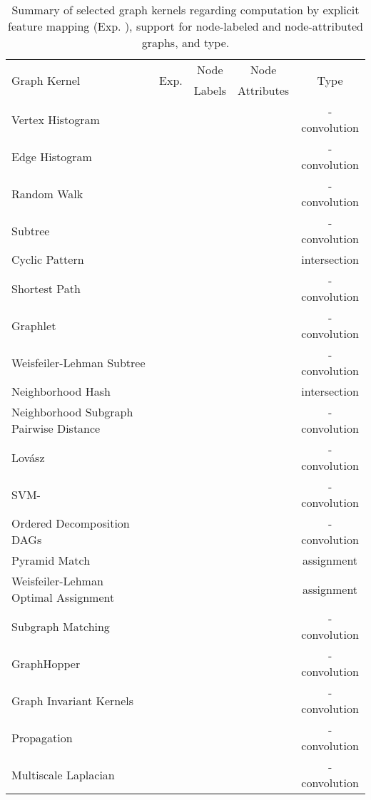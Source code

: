 \documentclass[twoside,11pt]{article}
\begin{document}
\begin{table}[t]
  \centering
  \scriptsize
  \begin{sc}
  \def\arraystretch{1.2}
  \begin{tabular}{l|c|c|c|c}
    \multirow{2}{*}{Graph Kernel}& \multirow{2}{*}{Exp. } & Node & Node & \multirow{2}{*}{Type} \\ 
    & & Labels & Attributes & \\ \hline
    Vertex Histogram &  &  &  & -convolution \\ 
    Edge Histogram &  &  &  & -convolution \\ 
    Random Walk &  &  &  & -convolution \\
    Subtree &  &  &  & -convolution \\
    Cyclic Pattern &  &  &  & intersection \\
    Shortest Path &  &  &  & -convolution  \\
    Graphlet &  &  &  & -convolution \\
    Weisfeiler-Lehman Subtree &  &  &  & -convolution \\ 
    Neighborhood Hash &  &  &  & intersection \\
    Neighborhood Subgraph Pairwise Distance &  &  &  & -convolution \\
    Lov\'asz  &  &  &  & -convolution \\ 
    SVM- &  &  &  & -convolution \\ 
    Ordered Decomposition DAGs &  &  &  & -convolution \\
    Pyramid Match &  &  &  & assignment \\
    Weisfeiler-Lehman Optimal Assignment &  &  &  & assignment \\ 
    Subgraph Matching &  &  &  & -convolution \\
    GraphHopper &  &  &  & -convolution \\ 
    Graph Invariant Kernels &  &  &  & -convolution \\ 
    Propagation &  &  &  & -convolution \\ 
    Multiscale Laplacian &  &  &  & -convolution \\ \hline
  \end{tabular}
  \end{sc}
  \caption{Summary of selected graph kernels regarding computation by explicit feature mapping (Exp. ), support for node-labeled and node-attributed graphs, and type.}
  \label{tab:comparison}
\end{table}
\end{document}
